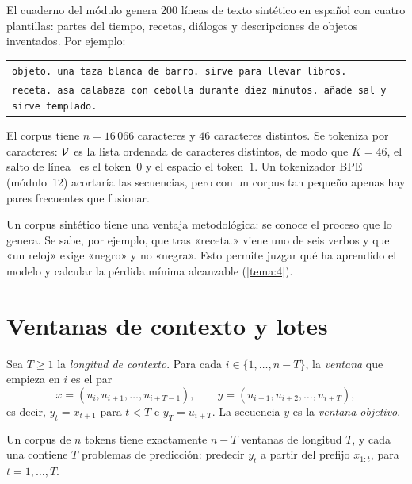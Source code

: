 \begin{ejemplo}\label{ej:corpus}
El cuaderno del módulo genera 200 líneas de texto sintético en español con cuatro plantillas: partes del tiempo, recetas, diálogos y descripciones de objetos inventados. Por ejemplo:
\begin{center}\small
\begin{tabular}{@{}l@{}}
\texttt{objeto. una taza blanca de barro. sirve para llevar libros.}\\
\texttt{receta. asa calabaza con cebolla durante diez minutos. añade sal y sirve templado.}
\end{tabular}
\end{center}
El corpus tiene $n=16\,066$ caracteres y $46$ caracteres distintos. Se tokeniza por caracteres: $\mathcal{V}$ es la lista ordenada de caracteres distintos, de modo que $K=46$, el salto de línea \nl\ es el token~$0$ y el espacio el token~$1$. Un tokenizador BPE (módulo~12) acortaría las secuencias, pero con un corpus tan pequeño apenas hay pares frecuentes que fusionar.
\end{ejemplo}

Un corpus sintético tiene una ventaja metodológica: se conoce el proceso que lo genera. Se sabe, por ejemplo, que tras «receta.» viene uno de seis verbos y que «un reloj» exige «negro» y no «negra». Esto permite juzgar qué ha aprendido el modelo y calcular la pérdida mínima alcanzable (\cref{tema:4}).

\section{Ventanas de contexto y lotes}

\begin{definicion}\label{def:ventana}
Sea $T\ge 1$ la \emph{longitud de contexto}. Para cada $i\in\{1,\dots,n-T\}$, la \emph{ventana} que empieza en $i$ es el par
\[
x=(u_i,u_{i+1},\dots,u_{i+T-1}),\qquad y=(u_{i+1},u_{i+2},\dots,u_{i+T}),
\]
es decir, $y_t=x_{t+1}$ para $t<T$ e $y_T=u_{i+T}$. La secuencia $y$ es la \emph{ventana objetivo}.
\end{definicion}

\begin{proposicion}\label{prop:ventanas}
Un corpus de $n$ tokens tiene exactamente $n-T$ ventanas de longitud $T$, y cada una contiene $T$ problemas de predicción: predecir $y_t$ a partir del prefijo $x_{1:t}$, para $t=1,\dots,T$.
\end{proposicion}

